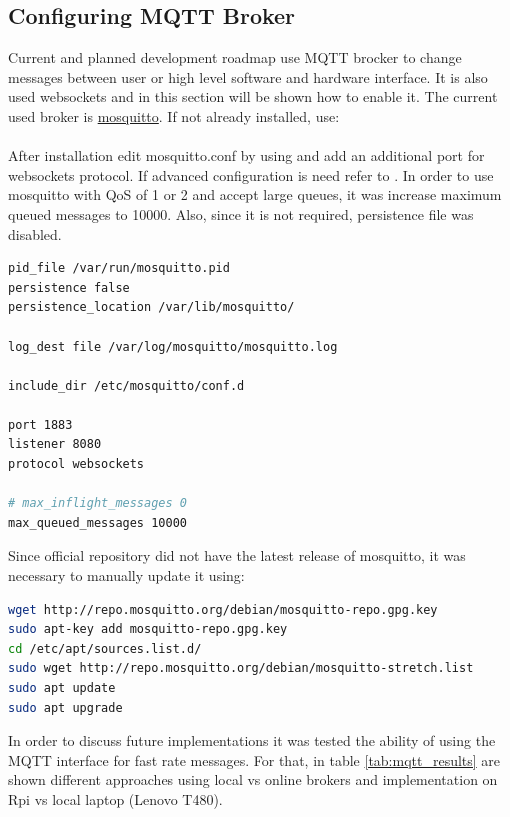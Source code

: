 \subsection{Configuring MQTT Broker}
Current and planned development roadmap use \gls{MQTT} brocker to change messages between user or high level software and hardware interface. It is also used websockets and in this section will be shown how to enable it. The current used broker is \href{https://mosquitto.org/}{mosquitto}. If not already installed, use:\\  \\
After installation edit mosquitto.conf by using  and add an additional port for websockets protocol. If advanced configuration is need refer to \cite{mosquitto_conf}. In order to use mosquitto with \gls{QoS} of 1 or 2 and accept large queues, it was increase maximum queued messages to 10000. Also, since it is not required, persistence file was disabled.

\begin{lstlisting}[frame=none,language=bash,backgroundcolor=\color{gray!15},numbers=none,		basicstyle=\ttfamily]
pid_file /var/run/mosquitto.pid
persistence false
persistence_location /var/lib/mosquitto/

log_dest file /var/log/mosquitto/mosquitto.log

include_dir /etc/mosquitto/conf.d

port 1883
listener 8080
protocol websockets

# max_inflight_messages 0
max_queued_messages 10000 
\end{lstlisting}

Since official repository did not have the latest release of mosquitto, it was necessary to
manually update it using:

\begin{lstlisting}[frame=none,language=bash,backgroundcolor=\color{gray!15},numbers=none,		basicstyle=\ttfamily]
wget http://repo.mosquitto.org/debian/mosquitto-repo.gpg.key
sudo apt-key add mosquitto-repo.gpg.key
cd /etc/apt/sources.list.d/
sudo wget http://repo.mosquitto.org/debian/mosquitto-stretch.list
sudo apt update
sudo apt upgrade
\end{lstlisting}

In order to discuss future implementations it was tested the ability of using the \gls{MQTT} interface for fast rate messages. For that, in table \ref{tab:mqtt_results} are shown different approaches using local vs online brokers and implementation on \gls{Rpi} vs local laptop (Lenovo T480).

